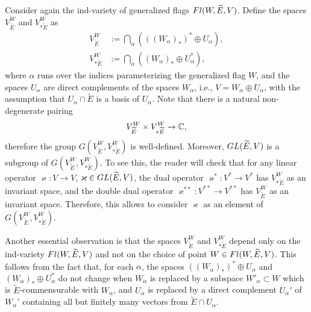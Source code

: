 \documentclass[11pt, a4paper]{article}
\begin{document}
Consider again the ind-variety of generalized flags $Fl(W,\widetilde{E},V)$. Define the spaces $V^W_{\widetilde{E}}$ and $V^W_{*\widetilde{E}}$ as \begin{equation*}
	\begin{split}	
	V^W_{\widetilde{E}}&:=\bigcap\limits_{\alpha} \left(\left(\left(W_{\alpha}\right)_*\right)^*\oplus U_{\alpha}\right),\\
	V^W_{*\widetilde{E}}&:=\bigcap\limits_{\alpha} \left(\left(W_{\alpha}\right)_*\oplus U^*_{\alpha}\right),
		\end{split}
\end{equation*}
where $\alpha$ runs over the indices parameterizing the generalized flag $W$, and the spaces $U_{\alpha}$ are direct complements of the spaces $W_{\alpha}$, i.e., $V=W_{\alpha}\oplus U_{\alpha}$, with the assumption that $U_{\alpha}\cap \widetilde{E}$ is a basis of $U_{\alpha}$. %
Note that there is a natural non-degenerate pairing \begin{equation*}
	V^W_{\widetilde{E}}\times V^W_{*\widetilde{E}} \rightarrow \mathbb{C},
\end{equation*}  
therefore the group $ G(V^W_{\widetilde{E}},V^W_{*\widetilde{E}})$ is well-defined. Moreover, $GL(\widetilde{E},V)$ is a subgroup of $ G(V^W_{\widetilde{E}},V^W_{*\widetilde{E}})$. To see this, the reader will check that for any linear operator $\varkappa \colon V \rightarrow V$, $\varkappa \in GL(\widetilde{E},V)$, the dual operator $\varkappa^* \colon V^* \rightarrow V^*$ has $V^W_{*\widetilde{E}}$ as an invariant space, and the double dual operator $\varkappa^{**} \colon V^{**} \rightarrow V^{**}$ has $V^W_{\widetilde{E}}$ as an invariant space. 
Therefore, this allows to consider $\varkappa$ as an element of $ G(V^W_{\widetilde{E}},V^W_{*\widetilde{E}})$.

 Another essential observation is that the spaces $V^W_{\widetilde{E}}$ and $V^W_{*\widetilde{E}}$ depend only on the ind-variety $Fl(W,\widetilde{E},V)$ and not on the choice of point $W\in Fl(W,\widetilde{E},V)$. This follows from the fact that, for each $\alpha$, the spaces $((W_{\alpha})_*)^*\oplus U_{\alpha}$ and $(W_{\alpha})_*\oplus U^*_{\alpha}$ do not change when $W_{\alpha}$ is replaced by a subspace $W'_{\alpha}\subset W$ which is $\widetilde{E}$-commensurable with $W_{\alpha}$, and $U_{\alpha}$ is replaced by a direct complement $U_{\alpha}'$ of $W_{\alpha}'$ containing all but finitely many vectors from $\widetilde{E}\cap U_{\alpha}$.  
\end{document}
